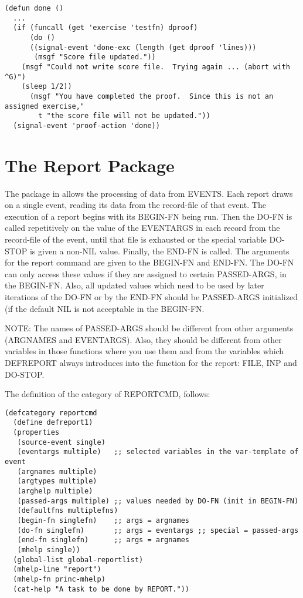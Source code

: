 \begin{verbatim}
(defun done ()
  ...
  (if (funcall (get 'exercise 'testfn) dproof)
      (do ()
	  ((signal-event 'done-exc (length (get dproof 'lines)))
	   (msgf "Score file updated."))
	(msgf "Could not write score file.  Trying again ... (abort with ^G)")
	(sleep 1/2))
      (msgf "You have completed the proof.  Since this is not an assigned exercise,"
	    t "the score file will not be updated."))
  (signal-event 'proof-action 'done))
\end{verbatim}

\section{The Report Package}

The  package in \TPS allows the processing of data
from EVENTS. Each report draws on a single event, reading
its data from the record-file of that event. The execution
of a report begins with its BEGIN-FN being run. Then 
the DO-FN is called repetitively on the value of the EVENTARGS
in each record from the record-file of the event, until that
file is exhausted or the special variable DO-STOP is given a non-NIL
value. Finally, the END-FN is called. The arguments
for the report command are given to the BEGIN-FN and END-FN.
The DO-FN can only access these values if they are assigned to
certain PASSED-ARGS, in the BEGIN-FN. Also, all updated values
which need to be used by later iterations of the DO-FN or by
the END-FN should be PASSED-ARGS initialized (if the default NIL
is not acceptable in the BEGIN-FN.

NOTE: The names of PASSED-ARGS should be different from
other arguments (ARGNAMES and EVENTARGS). Also, they should
be different from other variables in those functions where
you use them and from the variables which DEFREPORT always 
introduces into the function for the report: FILE, INP and DO-STOP.

The definition of the category of REPORTCMD, follows:

\begin{verbatim}
(defcategory reportcmd
  (define defreport1)
  (properties 
   (source-event single)
   (eventargs multiple)   ;; selected variables in the var-template of event
   (argnames multiple)
   (argtypes multiple)
   (arghelp multiple)
   (passed-args multiple) ;; values needed by DO-FN (init in BEGIN-FN)
   (defaultfns multiplefns)
   (begin-fn singlefn)    ;; args = argnames    
   (do-fn singlefn)       ;; args = eventargs ;; special = passed-args
   (end-fn singlefn)      ;; args = argnames
   (mhelp single))
  (global-list global-reportlist)
  (mhelp-line "report")
  (mhelp-fn princ-mhelp)
  (cat-help "A task to be done by REPORT."))

\end{verbatim}

